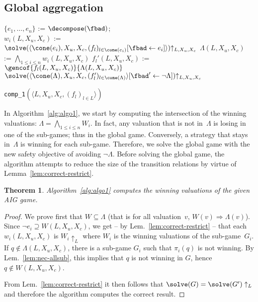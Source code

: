 \documentclass[submission,copyright,creativecommons]{eptcs}
\newtheorem{theorem}{Theorem}
\begin{document}
\subsection{Global aggregation}

\begin{algorithm}
	\small
	$\{e_1,\ldots,e_n\}$ := $\decompose(\fbad)$;
	\\
	{
		$w_i(L, X_u, X_c)$ := $\solve(\langle 
		\cone(e_i), X_u, X_c, (f_l)_{l \in \cone(e_i)}[\fbad \leftarrow
    e_i] \rangle){\uparrow_{L,X_u,X_c}}$\;
                \label{alg1-loc:endofloop}
	}
	$\Lambda(L, X_u, X_c)$ := $\bigwedge_{1 \le i \le n}
	w_i(L, X_u, X_c)$\;
	{
	  $f_l'(L, X_u, X_c)$ := $\gencof{f_l(L, X_u, X_c)}{\Lambda(L, X_u,
		X_c)}$
	}
	\label{alg1-loc:beforeret}
	\Return $\solve(\langle 
	\cone(\Lambda), X_u, X_c, (f'_l)_{l \in \cone(\Lambda)} \rangle
	     [\fbad' \leftarrow \lnot \Lambda]){\uparrow_{L,X_u,X_c}}$\;
\caption{\texttt{comp\_1}$(\langle L, X_u, X_c, (f_l)_{l\in L}\rangle)$}
\label{alg:algo1}
\end{algorithm}

In Algorithm~\ref{alg:algo1}, we start by computing the intersection of the
winning valuations: $\Lambda = \bigwedge_{1\leq i \leq n} W_i$. In fact, any
valuation that is not in~$\Lambda$ is losing in one of the sub-games; thus in
the global game. Conversely, a strategy that stays in~$\Lambda$ is winning for
each sub-game.  Therefore, we solve the global game with the new safety objective of
avoiding $\lnot \Lambda$.
Before solving the global game, the algorithm attempts to reduce the size of the
transition relations by virtue of Lemma~\ref{lem:correct-restrict}.

\begin{theorem}
  \label{thm:algo1-correct}
  Algorithm~\ref{alg:algo1} computes the winning valuations of the given AIG game.
\end{theorem}	
\begin{proof}
  We prove first that $W \subseteq \Lambda$ (that is for all valuation~$v$,
  $W(v) \Rightarrow \Lambda(v)$). Since $\lnot e_i \supseteq W(L,X_u,X_c)$, we
  get -- by Lem.~\ref{lem:correct-restrict} -- that
  each~$w_i(L,X_u,X_c)$ is $W_i\uparrow_L$ where $W_i$ is the winning valuations of
  the sub-game~$G_i$.  If $q \not\in \Lambda(L, X_u, X_c)$, there is a sub-game
  $G_i$ such that $\pi_i(q)$ is not winning.  By Lem.~\ref{lem:nec-allsub}, this
  implies that $q$ is not winning in $G$, hence $q\not\in W(L, X_u, X_c)$.

  From Lem.~\ref{lem:correct-restrict} it then follows that
  $\solve(G) = \solve(G')\uparrow_L$ and therefore the
  algorithm computes the correct result.
\end{proof}
\end{document}
